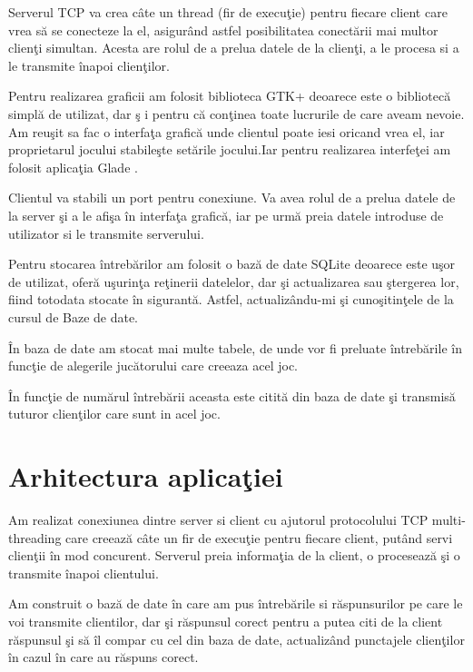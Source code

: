 \documentclass[11pt,leqno, runningheads]{llncs}
\begin{document}
Serverul TCP va crea c\^{a}te un thread\cite{2} (fir de execu\c tie) pentru fiecare client care vrea s\u a se conecteze la el, asigur\^{a}nd astfel posibilitatea conect\u arii mai multor clien\c ti simultan. Acesta are rolul de a prelua datele de la clien\c ti, a le procesa si a le transmite \^{i}napoi clien\c tilor. 

Pentru realizarea graficii am folosit biblioteca GTK+\cite{3} deoarece este o bibliotec\u a simpl\u a de utilizat, dar \c s i pentru c\u a con\c tinea toate lucrurile de care aveam nevoie. Am reu\c sit sa fac o interfa\c ta grafic\u a unde clientul poate iesi oricand vrea el, iar proprietarul jocului stabile\c ste set\u arile jocului.Iar pentru realizarea interfe\c tei am folosit aplica\c tia Glade \cite{4}.

Clientul va stabili un port pentru conexiune. Va avea rolul de a prelua datele de la server \c si a le afi\c sa \^{i}n interfa\c ta grafic\u a, iar pe urm\u a preia datele introduse de utilizator si le transmite serverului. 

Pentru stocarea \^{i}ntreb\u arilor am folosit o baz\u a de date SQLite\cite{5} deoarece este u\c sor de utilizat, ofer\u a u\c surin\c ta re\c tinerii datelelor, dar \c si actualizarea sau \c stergerea lor, fiind totodata stocate \^{i}n sigurant\u a. Astfel, actualiz\^{a}ndu-mi \c si cuno\c sitin\c tele de la cursul de Baze de date. 

\^{I}n baza de date am stocat mai multe tabele, de unde vor fi preluate \^{i}ntreb\u arile \^{i}n func\c tie de alegerile juc\u atorului care creeaza acel joc.

\^{I}n func\c tie de num\u arul \^{i}ntreb\u arii aceasta este citit\u a din baza de date \c si transmis\u a tuturor clien\c tilor care sunt in acel joc. 

\vspace{1 cm}

\section{Arhitectura aplica\c tiei }

\hspace{1 cm}Am realizat conexiunea dintre server si client cu ajutorul protocolului TCP multi-threading care creeaz\u a c\^{a}te un fir de execu\c tie pentru fiecare client, put\^{a}nd servi clien\c tii \^{i}n mod concurent. Serverul preia informa\c tia de la client, o proceseaz\u a \c si o transmite \^{i}napoi clientului.

Am construit o baz\u a de date \^{i}n care am pus \^{i}ntreb\u arile si r\u aspunsurilor pe care le voi transmite clientilor, dar \c si r\u aspunsul corect pentru a putea citi de la client r\u aspunsul \c si s\u a \^{i}l compar cu cel din baza de date, actualiz\^{a}nd punctajele clien\c tilor \^{i}n cazul \^{i}n care au r\u aspuns corect.
\end{document}
